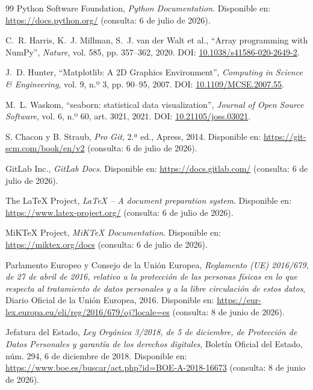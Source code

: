 \begin{sloppypar}
\begin{thebibliography}{99}
Python Software Foundation, \textit{Python Documentation}. Disponible en: \url{https://docs.python.org/} (consulta: 6 de julio de 2026).

C.~R. Harris, K.~J. Millman, S.~J. van der Walt et al., ``Array programming with NumPy'', \textit{Nature}, vol. 585, pp. 357--362, 2020. DOI\@: \href{https://doi.org/10.1038/s41586-020-2649-2}{10.1038/s41586-020-2649-2}.

J.~D. Hunter, ``Matplotlib: A 2D Graphics Environment'', \textit{Computing in Science \& Engineering}, vol. 9, n.º 3, pp. 90--95, 2007. DOI\@: \href{https://doi.org/10.1109/MCSE.2007.55}{10.1109/MCSE.2007.55}.

M.~L. Waskom, ``seaborn: statistical data visualization'', \textit{Journal of Open Source Software}, vol. 6, n.º 60, art. 3021, 2021. DOI\@: \href{https://doi.org/10.21105/joss.03021}{10.21105/joss.03021}.

S. Chacon y B. Straub, \textit{Pro Git}, 2.ª ed., Apress, 2014. Disponible en: \url{https://git-scm.com/book/en/v2} (consulta: 6 de julio de 2026).

GitLab Inc., \textit{GitLab Docs}. Disponible en: \url{https://docs.gitlab.com/} (consulta: 6 de julio de 2026).

The LaTeX Project, \textit{LaTeX -- A document preparation system}. Disponible en: \url{https://www.latex-project.org/} (consulta: 6 de julio de 2026).

MiKTeX Project, \textit{MiKTeX Documentation}. Disponible en: \url{https://miktex.org/docs} (consulta: 6 de julio de 2026).

Parlamento Europeo y Consejo de la Unión Europea, \textit{Reglamento (UE) 2016/679, de 27 de abril de 2016, relativo a la protección de las personas físicas en lo que respecta al tratamiento de datos personales y a la libre circulación de estos datos}, Diario Oficial de la Unión Europea, 2016. Disponible en: \url{https://eur-lex.europa.eu/eli/reg/2016/679/oj?locale=es} (consulta: 8 de junio de 2026).

Jefatura del Estado, \textit{Ley Orgánica 3/2018, de 5 de diciembre, de Protección de Datos Personales y garantía de los derechos digitales}, Boletín Oficial del Estado, núm. 294, 6 de diciembre de 2018. Disponible en: \url{https://www.boe.es/buscar/act.php?id=BOE-A-2018-16673} (consulta: 8 de junio de 2026).


\end{thebibliography}
\end{sloppypar}
